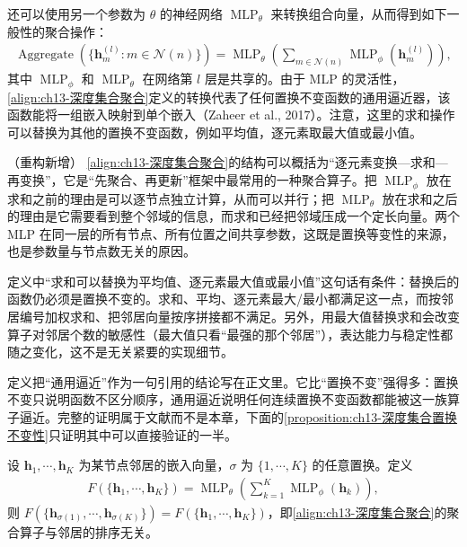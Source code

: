 \documentclass[../../main.tex]{subfiles}
\begin{document}
\begin{definition}[深度集合聚合算子]\label{definition:ch13-深度集合聚合}
还可以使用另一个参数为 $\theta$ 的神经网络 $\operatorname{MLP}_\theta$ 来转换组合向量，从而得到如下一般性的聚合操作：
\begin{align}
\operatorname{Aggregate}\!\left(\{\bm{h}_m^{(l)}:m\in\mathcal{N}(n)\}\right)=\operatorname{MLP}_\theta\!\left(\sum_{m\in\mathcal{N}(n)}\operatorname{MLP}_\phi(\bm{h}_m^{(l)})\right),
\label{align:ch13-深度集合聚合}
\end{align}
其中 $\operatorname{MLP}_\phi$ 和 $\operatorname{MLP}_\theta$ 在网络第 $l$ 层是共享的。由于 MLP 的灵活性，\eqref{align:ch13-深度集合聚合}定义的转换代表了任何置换不变函数的通用逼近器，该函数能将一组嵌入映射到单个嵌入（Zaheer et al., 2017）。注意，这里的求和操作可以替换为其他的置换不变函数，例如平均值，逐元素取最大值或最小值。
\end{definition}

\begin{remark}（重构新增）
\eqref{align:ch13-深度集合聚合}的结构可以概括为“逐元素变换—求和—再变换”，它是“先聚合、再更新”框架中最常用的一种聚合算子。把 $\operatorname{MLP}_\phi$ 放在求和之前的理由是可以逐节点独立计算，从而可以并行；把 $\operatorname{MLP}_\theta$ 放在求和之后的理由是它需要看到整个邻域的信息，而求和已经把邻域压成一个定长向量。两个 MLP 在同一层的所有节点、所有位置之间共享参数，这既是置换等变性的来源，也是参数量与节点数无关的原因。\par
定义中“求和可以替换为平均值、逐元素最大值或最小值”这句话有条件：替换后的函数仍必须是置换不变的。求和、平均、逐元素最大/最小都满足这一点，而按邻居编号加权求和、把邻居向量按序拼接都不满足。另外，用最大值替换求和会改变算子对邻居个数的敏感性（最大值只看“最强的那个邻居”），表达能力与稳定性都随之变化，这不是无关紧要的实现细节。\par
定义把“通用逼近”作为一句引用的结论写在正文里。它比“置换不变”强得多：置换不变只说明函数不区分顺序，通用逼近说明任何连续置换不变函数都能被这一族算子逼近。完整的证明属于文献而不是本章，下面的\cref{proposition:ch13-深度集合置换不变性}只证明其中可以直接验证的一半。
\end{remark}

\begin{proposition}[深度集合聚合的置换不变性]\label{proposition:ch13-深度集合置换不变性}
设 $\bm{h}_1,\cdots,\bm{h}_K$ 为某节点邻居的嵌入向量，$\sigma$ 为 $\{1,\cdots,K\}$ 的任意置换。定义
\begin{align*}
F(\{\bm{h}_1,\cdots,\bm{h}_K\})=\operatorname{MLP}_\theta\!\left(\sum_{k=1}^{K}\operatorname{MLP}_\phi(\bm{h}_k)\right),
\end{align*}
则 $F(\{\bm{h}_{\sigma(1)},\cdots,\bm{h}_{\sigma(K)}\})=F(\{\bm{h}_1,\cdots,\bm{h}_K\})$，即\eqref{align:ch13-深度集合聚合}的聚合算子与邻居的排序无关。
\end{proposition}
\end{document}
